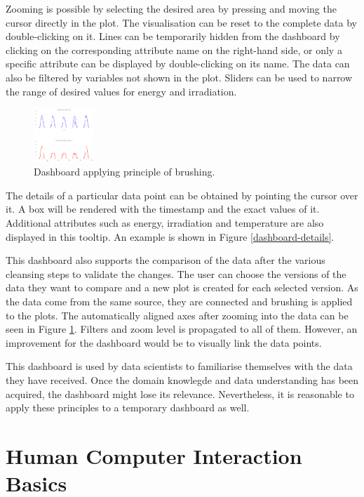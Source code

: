 \documentclass[11pt]{article}
\begin{document}
Zooming is possible by selecting the desired area by pressing and moving the cursor directly in the plot. The visualisation can be reset to the complete data by double-clicking on it. Lines can be temporarily hidden from the dashboard by clicking on the corresponding attribute name on the right-hand side, or only a specific attribute can be displayed by double-clicking on its name. The data can also be filtered by variables not shown in the plot. Sliders can be used to narrow the range of desired values for energy and irradiation.

\begin{figure}
    \includegraphics[width=0.2\textwidth]{./dashboard-brushing.png}
    \caption{Dashboard applying principle of brushing.}
    \label{dashboard-brushing}
\end{figure}

The details of a particular data point can be obtained by pointing the cursor over it. A box will be rendered with the timestamp and the exact values of it. Additional attributes such as energy, irradiation and temperature are also displayed in this tooltip. An example is shown in Figure \ref{dashboard-details}.

This dashboard also supports the comparison of the data after the various cleansing steps to validate the changes. The user can choose the versions of the data they want to compare and a new plot is created for each selected version. As the data come from the same source, they are connected and brushing is applied to the plots. The automatically aligned axes after zooming into the data can be seen in Figure \ref{dashboard-brushing}. Filters and zoom level is propagated to all of them. However, an improvement for the dashboard would be to visually link the data points.

This dashboard is used by data scientists to familiarise themselves with the data they have received. Once the domain knowlegde and data understanding has been acquired, the dashboard might lose its relevance. Nevertheless, it is reasonable to apply these principles to a temporary dashboard as well.

\pagebreak
\section{Human Computer Interaction Basics}
\end{document}
